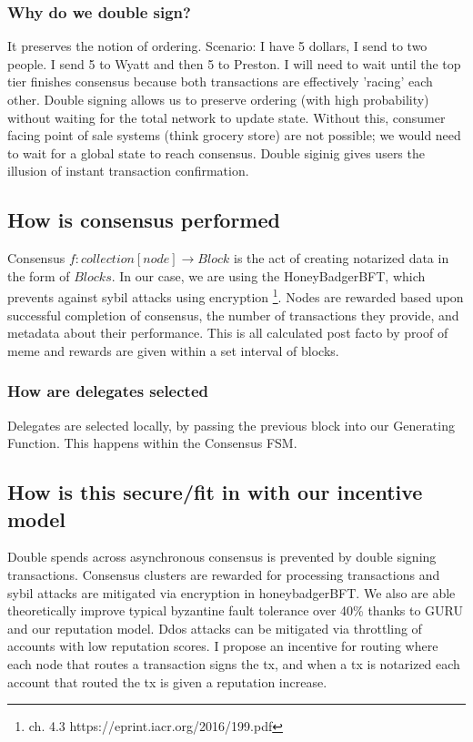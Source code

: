 \documentclass{article}
\begin{document}
\subsubsection{Why do we double sign?}
It preserves the notion of ordering. Scenario: I have 5 dollars, I send to two people. I send 5 to Wyatt and then 5 to Preston. I will need to wait until the top tier finishes consensus because both transactions are effectively 'racing' each other. Double signing allows us to preserve ordering (with high probability) without waiting for the total network to update state. Without this, consumer facing point of sale systems (think grocery store) are not possible; we would need to wait for a global state to reach consensus. Double siginig gives users the illusion of instant transaction confirmation.

\subsection{How is consensus performed}
Consensus $f: collection[node] \rightarrow  Block$ is the act of creating notarized data in the form of $Blocks$. In our case, we are using the HoneyBadgerBFT, which prevents against sybil attacks using encryption \footnote{ch. 4.3 https://eprint.iacr.org/2016/199.pdf}. Nodes are rewarded based upon successful completion of consensus, the number of transactions they provide, and metadata about their performance. This is all calculated post facto by proof of meme and rewards are given within a set interval of blocks.

\subsubsection{How are delegates selected}
Delegates are selected locally, by passing the previous block into our Generating Function. This happens within the Consensus FSM.

\subsection{How is this secure/fit in with our incentive model}
Double spends across asynchronous consensus is prevented by double signing transactions. Consensus clusters are rewarded for processing transactions and sybil attacks are mitigated via encryption in honeybadgerBFT. We also are able theoretically improve typical byzantine fault tolerance over 40\% thanks to GURU and our reputation model. Ddos attacks can be mitigated via throttling of accounts with low reputation scores. I propose an incentive for routing where each node that routes a transaction signs the tx, and when a tx is notarized each account that routed the tx is given a reputation increase.


\end{document}
